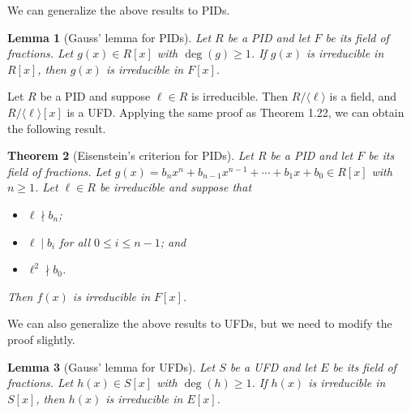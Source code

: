 \documentclass[10pt]{article}
\theoremstyle{newstyle}
\newtheorem{thm}{Theorem}[section]
\newtheorem{lemma}[thm]{Lemma}
\begin{document}
We can generalize the above results to PIDs.

\begin{lemma}[Gauss' lemma for PIDs]
Let $R$ be a PID and let $F$ be its field of fractions. Let $g(x) \in R[x]$ with $\deg(g) \geq 1$.
If $g(x)$ is irreducible in $R[x]$, then $g(x)$ is irreducible in $F[x]$. 
\end{lemma}

Let $R$ be a PID and suppose $\ell \in R$ is irreducible. Then $R/\langle\ell\rangle$ is 
a field, and $R/\langle\ell\rangle[x]$ is a UFD. Applying the same proof as Theorem 1.22, 
we can obtain the following result.

\begin{thm}[Eisenstein's criterion for PIDs]
Let $R$ be a PID and let $F$ be its field of fractions. Let $g(x) = b_n x^n + 
b_{n-1} x^{n-1} + \cdots + b_1x + b_0 \in R[x]$ with $n \geq 1$. Let $\ell \in R$ be irreducible 
and suppose that
\begin{itemize}
    \item $\ell \nmid b_n$;
    \item $\ell \mid b_i$ for all $0 \leq i \leq n-1$; and 
    \item $\ell^2 \nmid b_0$.
\end{itemize}
Then $f(x)$ is irreducible in $F[x]$.
\end{thm}

We can also generalize the above results to UFDs, but we need to modify the proof slightly. 

\begin{lemma}[Gauss' lemma for UFDs]
Let $S$ be a UFD and let $E$ be its field of fractions. Let $h(x) \in S[x]$ with $\deg(h) \geq 1$.
If $h(x)$ is irreducible in $S[x]$, then $h(x)$ is irreducible in $E[x]$. 
\end{lemma}
\end{document}
